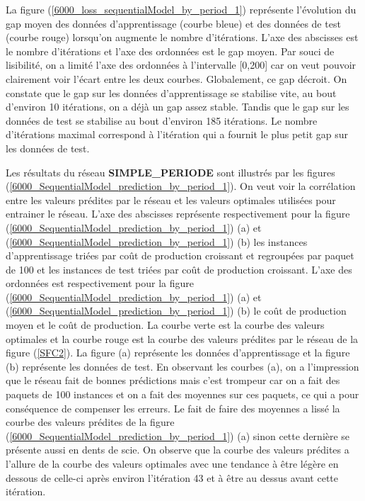   La figure (\ref{6000_loss_sequentialModel_by_period_1}) représente l'évolution du gap moyen des données d'apprentissage (courbe bleue) et des données de test (courbe rouge) lorsqu'on augmente le nombre d'itérations. L'axe des abscisses est le nombre d'itérations et l'axe des ordonnées est le gap moyen. Par souci de lisibilité, on a limité l'axe des ordonnées à l'intervalle [0,200] car on veut pouvoir clairement voir l'écart entre les deux courbes. Globalement, ce gap décroit. On constate que le gap sur les données d'apprentissage se stabilise vite, au bout d'environ 10 itérations, on a déjà un gap assez stable. Tandis que le gap sur les données de test se stabilise au bout d'environ 185 itérations. Le nombre d'itérations maximal correspond à l'itération qui a fournit le plus petit gap sur les données de test.
  
  Les résultats du réseau \textbf{SIMPLE\_PERIODE} sont illustrés par les figures  (\ref{6000_SequentialModel_prediction_by_period_1}). On veut voir la corrélation entre les valeurs prédites par le réseau et les valeurs optimales utilisées pour entrainer le réseau. L'axe des abscisses représente respectivement pour la figure (\ref{6000_SequentialModel_prediction_by_period_1}) (a) et (\ref{6000_SequentialModel_prediction_by_period_1}) (b) les instances d'apprentissage  triées par coût de production croissant et regroupées par paquet de 100 et les instances de test triées par coût de production croissant. L'axe des ordonnées est respectivement pour la figure (\ref{6000_SequentialModel_prediction_by_period_1}) (a) et (\ref{6000_SequentialModel_prediction_by_period_1}) (b) le coût de production moyen et le coût de production. La courbe verte est la courbe des valeurs optimales et la courbe rouge est la courbe des valeurs prédites par le réseau de la figure (\ref{SFC2}). La figure (a) représente les données d'apprentissage et la figure (b) représente les données de test. En observant les courbes (a), on a l'impression que le réseau fait de bonnes prédictions mais c'est trompeur car on a fait des paquets de 100 instances et on a fait des moyennes sur ces paquets, ce qui a pour conséquence de compenser les erreurs. Le fait de faire des moyennes a lissé la courbe des valeurs prédites de la figure (\ref{6000_SequentialModel_prediction_by_period_1}) (a) sinon cette dernière se présente aussi en dents de scie. On observe que la courbe des valeurs prédites a l'allure de la courbe des valeurs optimales avec une tendance à être légère en dessous de celle-ci après environ l'itération 43 et à être au dessus avant cette itération.
  
